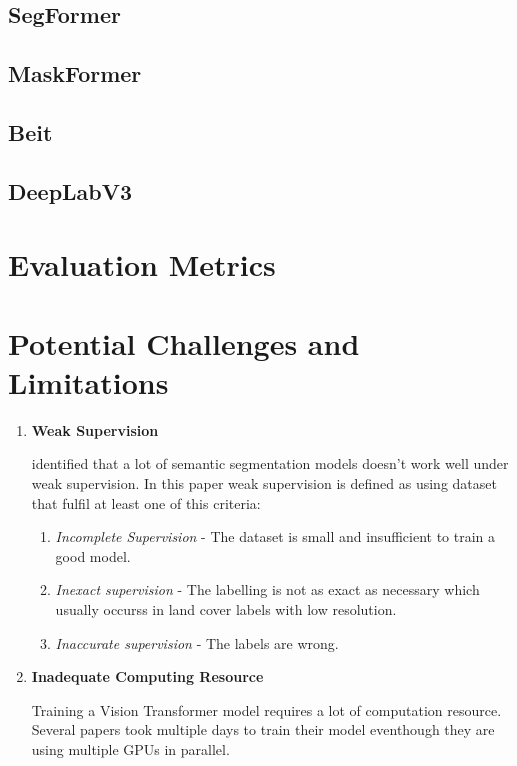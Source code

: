 \subsection{SegFormer}

\subsection{MaskFormer}

\subsection{Beit}

\subsection{DeepLabV3}
\section{Evaluation Metrics}
\section{Potential Challenges and Limitations}

\begin{enumerate}
    \item \textbf{Weak Supervision}
        
        \cite{weakly-supervised-semantic} identified that a lot of semantic segmentation models doesn't work well under weak supervision. In this paper weak supervision is defined as using dataset that fulfil at least one of this criteria:
\begin{enumerate}
    \item \textit{Incomplete Supervision} - The dataset is small and insufficient to train a good model.
    \item \textit{Inexact supervision} - The labelling is not as exact as necessary which usually occurss in land cover labels with low resolution.
    \item \textit{Inaccurate supervision} - The labels are wrong.
\end{enumerate}
\item \textbf{Inadequate Computing Resource}
    
    Training a Vision Transformer model requires a lot of computation resource. Several papers took multiple days to train their model eventhough they are using multiple GPUs in parallel. 


\end{enumerate}
